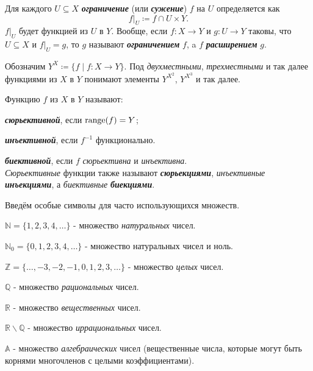 \documentclass{article}
\begin{document}
    \begin{definition_boxed}
        Для каждого $U \subseteq X$ \textbf{\textit{ограничение}} (или \textit{\textbf{сужение}}) $f$ на $U$ определяется как
        \[f|_U \coloneqq f \cap U \times Y.\]
        $f|_U$ будет функцией из $U$ в $Y$.
        Вообще, если $ f : X \rightarrow Y$ и $g : U \rightarrow Y $ таковы, что $ U \subseteq X  $ и $ f|_U= g $, то $g$ называют \textit{\textbf{ограничением}} $ f $, a $ f $ \textit{\textbf{расширением}} $ g $.
    \end{definition_boxed}

    \begin{definition_boxed}
        Обозначим $Y^X \coloneqq \{f\mid f:X\rightarrow Y\}.$
        Под \textit{двухместными}, \textit{трехместными} и так далее функциями из $X$ в $Y$ понимают элементы $Y^{X^2}$, $Y^{X^3}$ и так далее.
    \end{definition_boxed}

    \begin{definition_boxed}
        Функцию $f$ из $X$ в $Y$ называют:

        \textbf{\textit{сюрьективной}}, если $\mathrm{range} (f) = Y$;

        \textbf{\textit{инъективной}}, если $f^{-1}$ функционально.

        \textbf{\textit{биективной}}, если $ f $ \textit{сюрьективна} и \textit{инъективна}.\\
        \textit{Сюрьективные} функции также называют \textbf{\textit{сюрьекциями}}, \textit{инъективные} \textbf{\textit{инъекциями}}, а \textit{биективные} \textbf{\textit{биекциями}}.
    \end{definition_boxed}

    \begin{definition_boxed}
        Введём особые символы для часто использующихся множеств.

        $\mathbb{N} = \{1,2,3,4,\dotsc \}$ - множество \textit{натуральных} чисел.

        $\mathbb{N}_0 = \{0,1,2,3,4,\dotsc \}$ - множество натуральных чисел и ноль.

        $\mathbb{Z} = \{\dotsc, -3, -2, -1, 0,1,2,3,\dotsc \}$ - множество \textit{целых} чисел.

        $\mathbb{Q}$ - множество \textit{рациональных} чисел.

        $\mathbb{R}$ - множество \textit{вещественных} чисел.

        $\mathbb{R\backslash Q}$ - множество \textit{иррациональных} чисел.

        $\mathbb{A}$ - множество \textit{алгебраических} чисел (вещественные числа, которые могут быть корнями многочленов с целыми коэффициентами).
    \end{definition_boxed}
\end{document}
